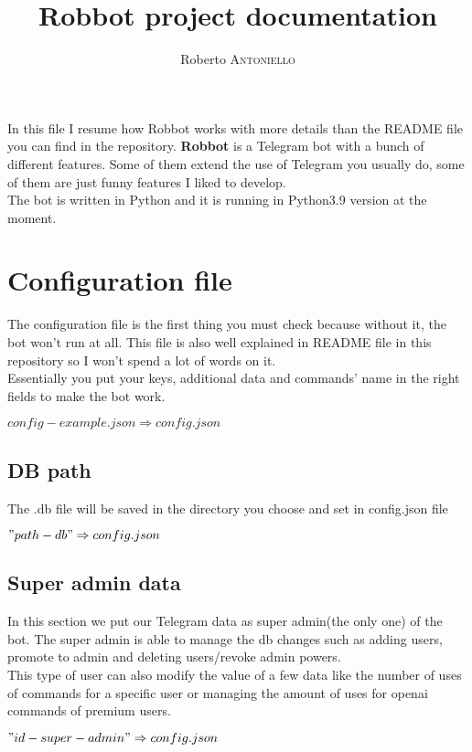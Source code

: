 \documentclass{article}
\title{Robbot project documentation} %
\author{Roberto \textsc{Antoniello}} %
\begin{document}
\maketitle %

\begin{center} In this file I resume how Robbot works with more details than the README file you can find in the repository.
\textbf{Robbot} is a Telegram bot with a bunch of different features. Some of them extend the use of Telegram you usually do, some of them are just funny features I liked to develop.\\
The bot is written in Python and it is running in Python3.9 version at the moment.\end{center}

\section{Configuration file}

The configuration file is the first thing you must check because without it, the bot won't run at all. This file is also well explained in README file in this repository so I won't spend a lot of words on it. \\Essentially you put your keys, additional data and commands' name in the right fields to make the bot work.
\begin{center} $config-example.json \Rightarrow config.json$ \end{center}

\subsection{DB path}
The .db file will be saved in the directory you choose and set in config.json file
\begin{center} $"path-db" \Rightarrow config.json$ \end{center}

\subsection{Super admin data}
In this section we put our Telegram data as super admin(the only one) of the bot. The super admin is able to manage the db changes such as adding users, promote to admin and deleting users/revoke admin powers.\\
This type of user can also modify the value of a few data like the number of uses of commands for a specific user or managing the amount of uses for openai commands of premium users.
\begin{center} $"id-super-admin" \Rightarrow config.json$ \end{center}
\end{document}
